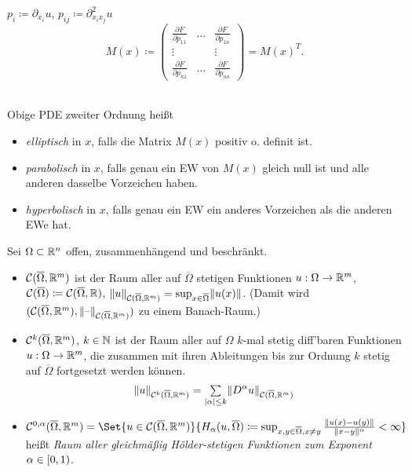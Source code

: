 \documentclass{cheat-sheet}
\newcommand{\Cont}{\mathcal{C}} %
\newcommand{\clos}[1]{\overline{#1}} %
\begin{document}
\begin{nota}
  $p_i \coloneqq \partial_{x_i} u$, $p_{ij} \coloneqq \partial^2_{x_i x_j} u$
  \[
    M(x) \coloneqq \begin{pmatrix}
      \tfrac{\partial F}{\partial p_{11}} & \hdots & \tfrac{\partial F}{\partial p_{1n}} \\
      \vdots && \vdots \\
      \tfrac{\partial F}{\partial p_{n1}} & \hdots & \tfrac{\partial F}{\partial p_{nn}}
    \end{pmatrix} = M(x)^{T}.
  \]
\end{nota}

\begin{defn}\mbox{}\\
  Obige PDE zweiter Ordnung heißt
  \begin{itemize}
    \item \emph{elliptisch} in $x$, falls die Matrix $M(x)$ positiv o. definit ist.
    \item \emph{parabolisch} in $x$, falls genau ein EW von $M(x)$ gleich null ist und alle anderen dasselbe Vorzeichen haben.
    \item \emph{hyperbolisch} in $x$, falls genau ein EW ein anderes Vorzeichen als die anderen EWe hat.
  \end{itemize}
\end{defn}




\begin{defn}
  Sei $\Omega \subset \mathbb{R}^n$ offen, zusammenhängend und beschränkt.
  \begin{itemize}
    \item $\Cont(\clos{\Omega}, \R^m)$ ist der Raum aller auf $\clos{\Omega}$ stetigen Funktionen $u : \Omega \to \mathbb{R}^m$, $\Cont(\clos{\Omega}) \coloneqq \Cont(\clos{\Omega}, \R)$, $\norm{u}_{\Cont(\clos{\Omega}, \R^m)} = \sup_{x \in \clos{\Omega}} \norm{u(x)}$.
    (Damit wird $(\Cont(\clos{\Omega}, \R^m), \norm{\blank}_{\Cont(\clos{\Omega}, \R^m)})$ zu einem Banach-Raum.)
    \item $\Cont^k(\clos{\Omega}, \R^m)$, $k \in \mathbb{N}$ ist der Raum aller auf $\Omega$ $k$-mal stetig diff'baren Funktionen $u : \Omega \to \mathbb{R}^m$, die zusammen mit ihren Ableitungen bis zur Ordnung $k$ stetig auf $\clos{\Omega}$ fortgesetzt werden können.
    \[ \norm{u}_{\Cont^k(\overline{\Omega}, \R^m)} = \sum_{\abs{\alpha} \leq k} \norm{D^\alpha u}_{\Cont(\overline{\Omega}, \R^m)} \]
    \item $\Cont^{0,\alpha}(\clos{\Omega}, \R^m) = \Set{u \in \Cont(\clos{\Omega}, \R^m)}{H_\alpha(u, \clos{\Omega}) \coloneqq \sup_{x, y \in \clos{\Omega}, x \neq y} \frac{\norm{u(x)-u(y)}}{\norm{x-y}^\alpha} < \infty}$ heißt \emph{Raum aller gleichmäßig Hölder-stetigen Funktionen zum Exponent $\alpha \in \left[ 0, 1 \right)$}.
  \end{itemize}
\end{defn}
\end{document}
